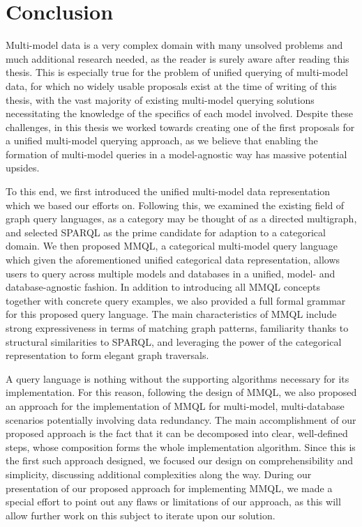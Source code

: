 \chapter*{Conclusion}

Multi-model data is a very complex domain with many unsolved problems and much additional research needed, as the reader is surely aware after reading this thesis.
This is especially true for the problem of unified querying of multi-model data, for which no widely usable proposals exist at the time of writing of this thesis, with the vast majority of existing multi-model querying solutions necessitating the knowledge of the specifics of each model involved.
Despite these challenges, in this thesis we worked towards creating one of the first proposals for a unified multi-model querying approach, as we believe that enabling the formation of multi-model queries in a model-agnostic way has massive potential upsides.

To this end, we first introduced the unified multi-model data representation~\cite{one_model}\cite{unified_representation} which we based our efforts on.
Following this, we examined the existing field of graph query languages, as a category may be thought of as a directed multigraph, and selected SPARQL as the prime candidate for adaption to a categorical domain.
We then proposed MMQL, a categorical multi-model query language which given the aforementioned unified categorical data representation, allows users to query across multiple models and databases in a unified, model- and database-agnostic fashion.
In addition to introducing all MMQL concepts together with concrete query examples, we also provided a full formal grammar for this proposed query language.
The main characteristics of MMQL include strong expressiveness in terms of matching graph patterns, familiarity thanks to structural similarities to SPARQL, and leveraging the power of the categorical representation to form elegant graph traversals.

A query language is nothing without the supporting algorithms necessary for its implementation.
For this reason, following the design of MMQL, we also proposed an approach for the implementation of MMQL for multi-model, multi-database scenarios potentially involving data redundancy.
The main accomplishment of our proposed approach is the fact that it can be decomposed into clear, well-defined steps, whose composition forms the whole implementation algorithm.
Since this is the first such approach designed, we focused our design on comprehensibility and simplicity, discussing additional complexities along the way.
During our presentation of our proposed approach for implementing MMQL, we made a special effort to point out any flaws or limitations of our approach, as this will allow further work on this subject to iterate upon our solution.

